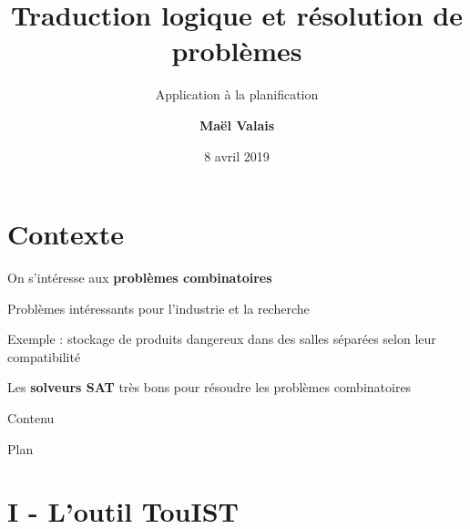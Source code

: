 \documentclass[english,french,usenames,dvipsnames]{beamer}
\title{Traduction logique et r\'{e}solution de probl\`{e}mes}
\subtitle{Application \`{a} la planification}
\author{\textbf{Ma\"el Valais}}
\date{8 avril 2019}
\institute[UT3]{IRIT -- Universit\'{e} Toulouse III (France)}
\begin{document}

\begin{frame}
\titlepage
\end{frame}

\section*{Contexte}
\begin{frame}{\sectionname}
On s'intéresse aux \textbf{problèmes combinatoires}

Problèmes intéressants pour l'industrie et la recherche

Exemple : stockage de produits dangereux dans des salles séparées selon leur compatibilité

Les \textbf{solveurs SAT} très bons pour résoudre les problèmes combinatoires

\end{frame}

\begin{frame}{Contenu}
\tableofcontents[subsectionstyle=hide/hide/hide]
\end{frame}



\begin{frame}{Plan}
\section{I - L'outil TouIST}
\tableofcontents[currentsection,subsectionstyle=show/show/hide]
\end{frame}
\end{document}
